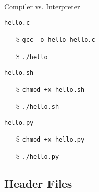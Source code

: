 \begin{frame}{Compiler vs. Interpreter}
  \begin{iblock}{\texttt{hello.c}}
    \begin{minipage}{.4\linewidth}
    \end{minipage}
    \begin{minipage}{.5\linewidth}
      \begin{itemize}
      \item[\$] \texttt{gcc -o hello hello.c}
      \item[\$] \texttt{./hello}
      \end{itemize}
    \end{minipage}
  \end{iblock}
  \begin{iblock}{\texttt{hello.sh}}
    \begin{minipage}{.4\linewidth}
    \end{minipage}
    \begin{minipage}{.5\linewidth}
      \begin{enumerate}
      \item[\$] \texttt{chmod +x hello.sh}
      \item[\$] \texttt{./hello.sh}
      \end{enumerate}
    \end{minipage}
  \end{iblock}
  \begin{iblock}{\texttt{hello.py}}
    \begin{minipage}{.4\linewidth}
    \end{minipage}
    \begin{minipage}{.5\linewidth}
      \begin{enumerate}
      \item[\$] \texttt{chmod +x hello.py}
      \item[\$] \texttt{./hello.py}
      \end{enumerate}
    \end{minipage}
  \end{iblock}
\end{frame}

\subsection{Header Files}
\label{sec:header-files}

